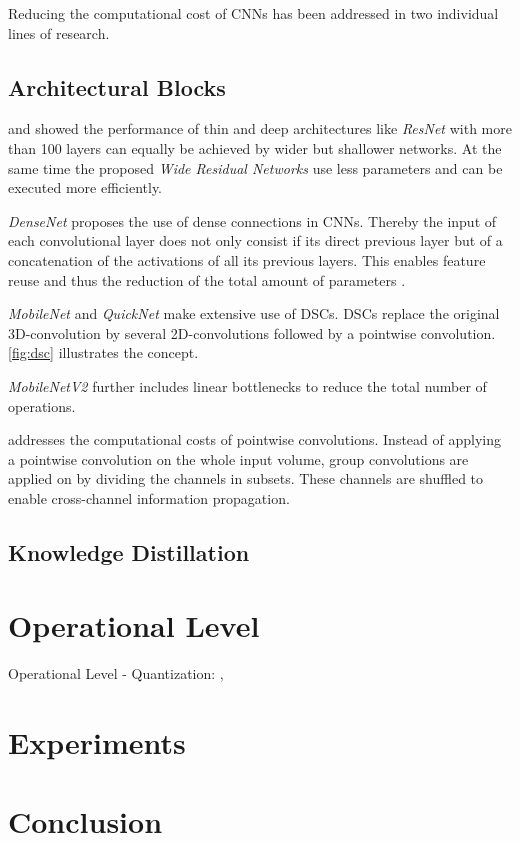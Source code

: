 Reducing the computational cost of \acp{CNN} has been addressed in two individual lines of research.

\subsection{Architectural Blocks}

\cite{YoungwanLee} and \cite{Zagoruyko2016} showed the performance of thin and deep architectures like \textit{ResNet} with more than 100 layers can equally be achieved by wider but shallower networks. At the same time the proposed \textit{Wide Residual Networks} use less parameters and can be executed more efficiently.

\textit{DenseNet} \cite{Huang2016} proposes the use of dense connections in \acp{CNN}. Thereby the input of each convolutional layer does not only consist if its direct previous layer but of a concatenation of the activations of all its previous layers. This enables feature reuse  and thus the reduction of the total amount of parameters .

\textit{MobileNet} \cite{Howard2017} and \textit{QuickNet} \cite{Ghosh2017} make extensive use of \acp{DSC}. \acp{DSC} replace the original 3D-convolution by several 2D-convolutions followed by a pointwise convolution. \autoref{fig:dsc} illustrates the concept.

\textit{MobileNetV2} \cite{Sandler2018} further includes linear bottlenecks to reduce the total number of operations.

\cite{Zhang2017a} addresses the computational costs of pointwise convolutions. Instead of applying a pointwise convolution on the whole input volume, group convolutions are applied on by dividing the channels in subsets. These channels are shuffled to enable cross-channel information propagation. 

\subsection{Knowledge Distillation}


\section{Operational Level}
Operational Level - Quantization:
\cite{TripathiSanDiego}, 




\section{Experiments}


\section{Conclusion}